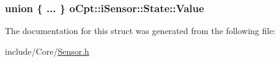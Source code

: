 \subsubsection[{\texorpdfstring{Value}{Value}}]{\setlength{\rightskip}{0pt plus 5cm}union \{ ... \}   o\+Cpt\+::i\+Sensor\+::\+State\+::\+Value}\hypertarget{structo_cpt_1_1i_sensor_1_1_state_a06647568e4b1b28e5a22dd385bd0c934}{}\label{structo_cpt_1_1i_sensor_1_1_state_a06647568e4b1b28e5a22dd385bd0c934}


The documentation for this struct was generated from the following file\+:\begin{DoxyCompactItemize}
\item 
include/\+Core/\hyperlink{_sensor_8h}{Sensor.\+h}\end{DoxyCompactItemize}
